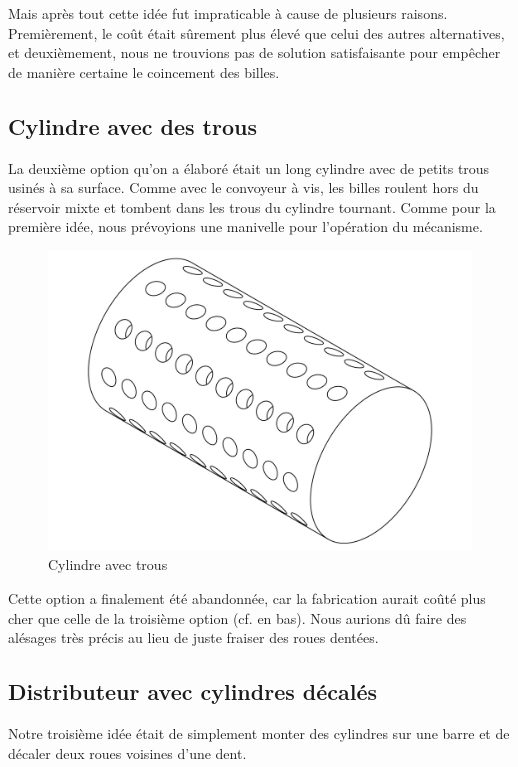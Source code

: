 Mais après tout cette idée fut impraticable à cause de plusieurs raisons. Premièrement, le coût était sûrement plus élevé que celui des autres alternatives, et deuxièmement, nous ne trouvions pas de solution satisfaisante pour empêcher de manière certaine le coincement des billes.

\subsection{Cylindre avec des trous}
La deuxième option qu'on a élaboré était un long cylindre avec de petits trous usinés à sa surface. Comme avec le convoyeur à vis, les billes roulent hors du réservoir mixte et tombent dans les trous du cylindre tournant. Comme pour la première idée, nous prévoyions une manivelle pour l'opération du mécanisme.

\begin{figure}
    \centering
    \includegraphics[width=\textwidth]{Graphics/Roue/DRAWING_PROTOTYP_CYLINDRE.pdf}
    \caption{Cylindre avec trous}
\end{figure}

Cette option a finalement été abandonnée, car la fabrication aurait coûté plus cher que celle de la troisième option (cf. en bas). Nous aurions dû faire des alésages très précis au lieu de juste fraiser des roues dentées.

\subsection{Distributeur avec cylindres décalés}
Notre troisième idée était de simplement monter des cylindres sur une barre et de décaler deux roues voisines d'une dent.


